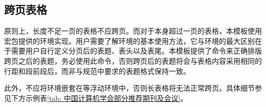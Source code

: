 \documentclass[print, doctor, vlined]{DissertUESTC}
\begin{document}
	
	\clearpage
	\subsection{跨页表格}
	
	原则上，长度不足一页的表格不应跨页。而对于本身超过一页的表格，本模板使用宏包提供的环境实现。用户需要了解环境的基本使用方法，它与环境的最大区别在于需要用户自行定义分页后的表题、表头以及表尾。本模板提供了命令来正确排版跨页之后的表题，务必使用此命令，否则跨页后的表题将会与表格内容采用相同的行距和段前段后，而非与规范中要求的表题格式保持一致。
	
	此外，不应将环境嵌套在等浮动环境中，否则长表格将无法正常跨页。具体细节参见下方示例表\ref{tab: 中国计算机学会部分推荐期刊及会议}。
	
\end{document}
